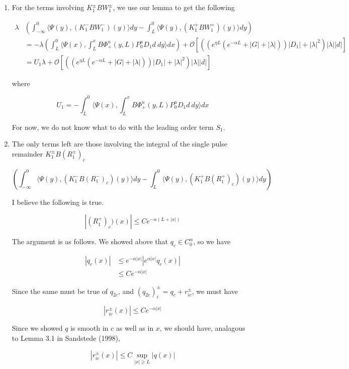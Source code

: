 \documentclass[12pt]{article}
\begin{document}
\begin{enumerate}
\item For the terms involving $K_1^\pm B W_1^\pm$, we use our lemma to get the following

\begin{align*}
\lambda&\left( \int_{-\infty}^0 \langle \Psi(y), (K_1^- B W_1^-)(y) \rangle dy - \int_{L}^0 \langle \Psi(y), (K_1^+ B W_1^+)(y) \rangle dy \right) \\
&= -\lambda \left( \int_{L}^0 \langle \Psi(x), \int_{L}^x B\Phi^u_+(y, L) P_0^u D_1 d \:dy \rangle dx \right) + \mathcal{O} \left[ \left(\left( e^{\eta L}(e^{-\alpha L} + |G| + |\lambda|) \right)|D_1| + |\lambda|^2 \right)|\lambda| |d|\right] \\
&= U_1 \lambda + \mathcal{O} \left[ \left(\left( e^{\eta L}(e^{-\alpha L} + |G| + |\lambda|) \right)|D_1| + |\lambda|^2 \right)|\lambda| |d|\right]
\end{align*}

where

\[
U_1 = -\int_{L}^0 \langle \Psi(x), \int_{L}^x B\Phi^u_+(y, L) P_0^u D_1 d\:dy \rangle dx 
\]

For now, we do not know what to do with the leading order term $S_1$.

\item The only terms left are those involving the integral of the single pulse remainder $K_1^\pm B (R_1^\pm)_c$

\[
\left( \int_{-\infty}^0 \langle \Psi(y), (K_1^- B (R_1^-)_c)(y) \rangle dy - \int_{L}^0 \langle \Psi(y), (K_1^+ B (R_1^+)_c)(y) \rangle dy \right) 
\]

I believe the following is true.

\[
|(R_1^+)_c)(x)| \leq Ce^{-\alpha(L + |x|)}
\]

The argument is as follows. We showed above that $q_c \in C_0^\alpha$, so we have

\begin{align*}
|q_c(x)| &\leq e^{-\alpha |x|} | e^{\alpha |x|} q_c(x) | \\
&\leq C e^{-\alpha |x|} 
\end{align*} 

Since the same must be true of $q_{2c}$, and $(q_{2c})_i^\pm = q_c + r_{ic}^\pm$, we must have

\[
|r_{ic}^\pm(x)| \leq C e^{-\alpha |x|} 
\] 

Since we showed $q$ is smooth in $c$ as well as in $x$, we should have, analagous to Lemma 3.1 in Sandstede (1998),

\[
|r_{ic}^\pm(x)| \leq C \sup_{|x| \geq L} |q(x)|
\]


\end{enumerate}
\end{document}
